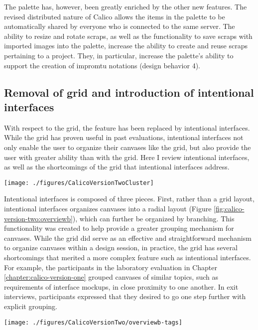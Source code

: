 The palette has, however, been greatly enriched by the other new features. The revised distributed nature of Calico allows the items in the palette to be automatically shared by everyone who is connected to the same server. The ability to resize and rotate scraps, as well as the functionality to save scraps with imported images into the palette, increase the ability to create and reuse scraps pertaining to a project. They, in particular, increase the palette's ability to support the creation of impromtu notations (design behavior 4).

\subsection{Removal of grid and introduction of intentional interfaces}

With respect to the grid, the feature has been replaced by intentional interfaces. While the grid has proven useful in past evaluations, intentional interfaces not only enable the user to organize their canvases like the grid, but also provide the user with greater ability than with the grid. Here I review intentional interfaces, as well as the shortcomings of the grid that intentional interfaces address. 

\begin{figure*}[tbh]
  \centering
  \texttt{[image: ./figures/CalicoVersionTwoCluster]}
  \caption{Intentional Interfaces - Intention View.}
  \label{fig:calico-version-two:overviewb}
\end{figure*}

Intentional interfaces is composed of three pieces. First, rather than a grid layout, intentional interfaces organizes canvases into a radial layout (Figure \ref{fig:calico-version-two:overviewb}), which can further be organized by branching. This functionality was created to help provide a greater grouping mechanism for canvases. While the grid did serve as an effective and straightforward mechanism to organize canvases within a design session, in practice, the grid has several shortcomings that merited a more complex feature such as intentional interfaces. For example, the participants in the laboratory evaluation in Chapter \ref{chapter:calico-version-one} grouped canvases of similar topics, such as requirements of interface mockups, in close proximity to one another. In exit interviews, participants expressed that they desired to go one step further with explicit grouping. 

\begin{figure*}[tbh]
  \centering
  \texttt{[image: ./figures/CalicoVersionTwo/overviewb-tags]}
  \caption{Canvases are related to one another within intentional interfaces using tags.}
  \label{fig:calico-version-two:overviewb-tags}
\end{figure*}

